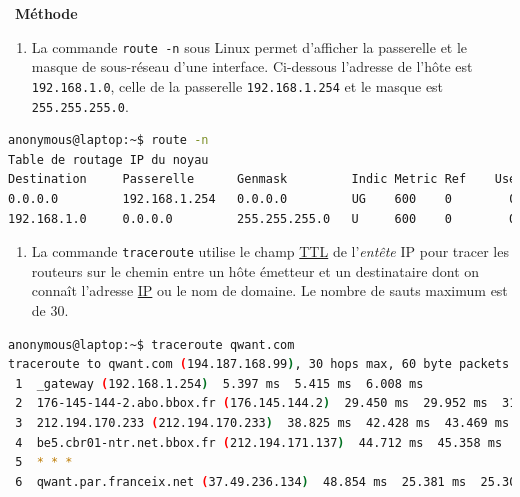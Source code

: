 \documentclass[
  11pt,
]{article}
\newcommand{\passthrough}[1]{#1}
\providecommand{\tightlist}{%
  \setlength{\itemsep}{0pt}\setlength{\parskip}{0pt}}
\newcounter{def}
\newenvironment{methode}[1]
{\par \medskip    \noindent  
 \begin {bclogo}[arrondi =0.1,logo=\bcoutil, marge=4,noborder = true] {~\textbf{Méthode}   {\itshape #1} }  \par}
{
\end{bclogo}
 \par \bigskip }
\begin{document}
\begin{methode}{}
\begin{enumerate}
\def\labelenumi{\arabic{enumi}.}
\setcounter{enumi}{2}
\tightlist
\item
  La commande \passthrough{\lstinline!route -n!} sous Linux permet
  d'afficher la passerelle et le masque de sous-réseau d'une interface.
  Ci-dessous l'adresse de l'hôte est
  \passthrough{\lstinline!192.168.1.0!}, celle de la passerelle
  \passthrough{\lstinline!192.168.1.254!} et le masque est
  \passthrough{\lstinline!255.255.255.0!}.
\end{enumerate}

\begin{lstlisting}[language=bash]
anonymous@laptop:~$ route -n
Table de routage IP du noyau
Destination     Passerelle      Genmask         Indic Metric Ref    Use Iface
0.0.0.0         192.168.1.254   0.0.0.0         UG    600    0        0 wlp2s0
192.168.1.0     0.0.0.0         255.255.255.0   U     600    0        0 wlp2s0
\end{lstlisting}

\begin{enumerate}
\def\labelenumi{\arabic{enumi}.}
\setcounter{enumi}{3}
\tightlist
\item
  La commande \passthrough{\lstinline!traceroute!} utilise le champ
  \href{https://fr.wikipedia.org/wiki/Time_to_Live}{TTL} de
  l'\emph{entête} IP pour tracer les routeurs sur le chemin entre un
  hôte émetteur et un destinataire dont on connaît l'adresse
  \href{https://fr.wikipedia.org/wiki/Internet_Protocol}{IP} ou le nom
  de domaine. Le nombre de sauts maximum est de 30.
\end{enumerate}

\begin{lstlisting}[language=bash]
anonymous@laptop:~$ traceroute qwant.com
traceroute to qwant.com (194.187.168.99), 30 hops max, 60 byte packets
 1  _gateway (192.168.1.254)  5.397 ms  5.415 ms  6.008 ms
 2  176-145-144-2.abo.bbox.fr (176.145.144.2)  29.450 ms  29.952 ms  31.584 ms
 3  212.194.170.233 (212.194.170.233)  38.825 ms  42.428 ms  43.469 ms
 4  be5.cbr01-ntr.net.bbox.fr (212.194.171.137)  44.712 ms  45.358 ms  46.831 ms
 5  * * *
 6  qwant.par.franceix.net (37.49.236.134)  48.854 ms  25.381 ms  25.308 ms
\end{lstlisting}

\end{methode}
\end{document}
